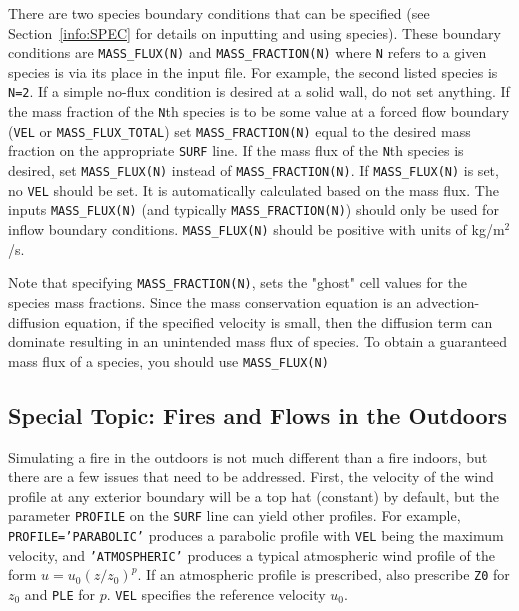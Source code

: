 \documentclass[11pt]{book}
\newcommand{\ct}{\tt\small}
\begin{document}
There are two species boundary conditions that can be specified
(see Section~\ref{info:SPEC} for details on inputting and using species).
These boundary conditions are {\ct MASS\_FLUX(N)} and {\ct MASS\_FRACTION(N)}
where {\ct N} refers to a given species is via its place in the
input file. For example, the second listed species is {\ct N=2}.
If a simple no-flux condition is desired at a solid wall, do not set
anything. If the mass fraction of the {\ct N}th species is to be some
value at a forced flow boundary ({\ct VEL} or {\ct MASS\_FLUX\_TOTAL}) set
{\ct MASS\_FRACTION(N)} equal to the desired mass fraction on the appropriate
{\ct SURF} line.
If the mass flux of the {\ct N}th species is desired, set
{\ct MASS\_FLUX(N)} instead of {\ct MASS\_FRACTION(N)}.
If {\ct MASS\_FLUX(N)}
is set, no {\ct VEL} should be set. It is automatically
calculated based on the mass flux.
The inputs {\ct MASS\_FLUX(N)} (and typically {\ct MASS\_FRACTION(N)}) should only be used
for inflow boundary conditions.  {\ct MASS\_FLUX(N)} should be positive with
units of kg/m$^2$/s.

\begin{warning}
\noindent
Note that specifying {\ct MASS\_FRACTION(N)}, sets the "ghost" cell values for the species
mass fractions.  Since the mass conservation equation is an advection-diffusion equation,
if the specified velocity is small, then the diffusion term can dominate resulting in an unintended
mass flux of species.  To obtain a guaranteed mass flux of a species, you should use {\ct MASS\_FLUX(N)}
\end{warning}


\subsection{Special Topic: Fires and Flows in the Outdoors}
Simulating a fire in the outdoors is not much different than a fire
indoors, but there are a few issues that need to be addressed.
First, the velocity of the wind profile at any exterior boundary will be a top hat (constant) by default,
but the parameter {\ct PROFILE} on the {\ct SURF} line
can yield other profiles.
For example, {\ct PROFILE='PARABOLIC'} produces a parabolic profile with
{\ct VEL} being the maximum velocity,
and {\ct 'ATMOSPHERIC'} produces a typical atmospheric wind
profile of the form $u=u_0 (z/z_0)^p$. If an atmospheric profile is
prescribed, also prescribe {\ct Z0} for $z_0$  and {\ct PLE} for $p$.
{\ct VEL} specifies the reference velocity $u_0$.
\end{document}
